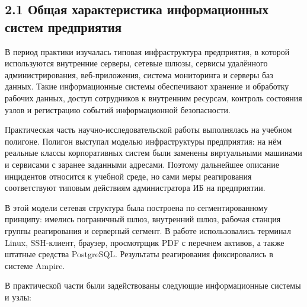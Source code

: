 \documentclass[14pt]{extarticle}
\begin{document}
\subsection*{2.1 Общая характеристика информационных систем предприятия}

В период практики изучалась типовая инфраструктура предприятия, в которой используются внутренние серверы, сетевые шлюзы, сервисы удалённого администрирования, веб-приложения, система мониторинга и серверы баз данных. Такие информационные системы обеспечивают хранение и обработку рабочих данных, доступ сотрудников к внутренним ресурсам, контроль состояния узлов и регистрацию событий информационной безопасности.

Практическая часть научно-исследовательской работы выполнялась на учебном полигоне. Полигон выступал моделью инфраструктуры предприятия: на нём реальные классы корпоративных систем были заменены виртуальными машинами и сервисами с заранее заданными адресами. Поэтому дальнейшее описание инцидентов относится к учебной среде, но сами меры реагирования соответствуют типовым действиям администратора ИБ на предприятии.

В этой модели сетевая структура была построена по сегментированному принципу: имелись пограничный шлюз, внутренний шлюз, рабочая станция группы реагирования и серверный сегмент. В работе использовались терминал Linux, SSH-клиент, браузер, просмотрщик PDF с перечнем активов, а также штатные средства PostgreSQL. Результаты реагирования фиксировались в системе Ampire.

В практической части были задействованы следующие информационные системы и узлы:
\end{document}
